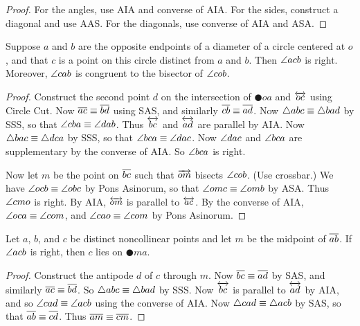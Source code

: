 \begin{proof}
For the angles, use AIA and converse of AIA.
For the sides, construct a diagonal and use AAS.
For the diagonals, use converse of AIA and ASA.
\end{proof}

\begin{prop}
Suppose \(a\) and \(b\) are the opposite endpoints of a diameter of a circle centered at \(o\), and that \(c\) is a point on this circle distinct from \(a\) and \(b\).
Then \(\angle{acb}\) is right.
Moreover, \(\angle{cab}\) is congruent to the bisector of \(\angle{cob}\).
\end{prop}

\begin{proof}
Construct the second point \(d\) on the intersection of \(\CIRCLE{o}{a}\) and \(\overleftrightarrow{oc}\) using Circle Cut.
Now \(\overline{ac} \equiv \overline{bd}\) using SAS, and similarly \(\overline{cb} \equiv \overline{ad}\).
Now \(\bigtriangleup{abc} \equiv \bigtriangleup{bad}\) by SSS, so that \(\angle{cba} \equiv \angle{dab}\).
Thus \(\overleftrightarrow{bc}\) and \(\overleftrightarrow{ad}\) are parallel by AIA.
Now \(\bigtriangleup{bac} \equiv \bigtriangleup{dca}\) by SSS, so that \(\angle{bca} \equiv \angle{dac}\).
Now \(\angle{dac}\) and \(\angle{bca}\) are supplementary by the converse of AIA.
So \(\angle{bca}\) is right.

Now let \(m\) be the point on \(\overline{bc}\) such that \(\overrightarrow{om}\) bisects \(\angle{cob}\).
(Use crossbar.)
We have \(\angle{ocb} \equiv \angle{obc}\) by Pons Asinorum, so that \(\angle{omc} \equiv \angle{omb}\) by ASA.
Thus \(\angle{cmo}\) is right.
By AIA, \(\overleftrightarrow{om}\) is parallel to \(\overleftrightarrow{ac}\).
By the converse of AIA, \(\angle{oca} \equiv \angle{com}\), and \(\angle{cao} \equiv \angle{com}\) by Pons Asinorum.
\end{proof}

\begin{prop}
Let \(a\), \(b\), and \(c\) be distinct noncollinear points and let \(m\) be the midpoint of \(\overline{ab}\).
If \(\angle{acb}\) is right, then \(c\) lies on \(\CIRCLE{m}{a}\).
\end{prop}

\begin{proof}
Construct the antipode \(d\) of \(c\) through \(m\).
Now \(\overline{bc} \equiv \overline{ad}\) by SAS, and similarly \(\overline{ac} \equiv \overline{bd}\).
So \(\bigtriangleup{abc} \equiv \bigtriangleup{bad}\) by SSS.
Now \(\overleftrightarrow{bc}\) is parallel to \(\overleftrightarrow{ad}\) by AIA, and so \(\angle{cad} \equiv \angle{acb}\) using the converse of AIA.
Now \(\bigtriangleup{cad} \equiv \bigtriangleup{acb}\) by SAS, so that \(\overline{ab} \equiv \overline{cd}\).
Thus \(\overline{am} \equiv \overline{cm}\).
\end{proof}

